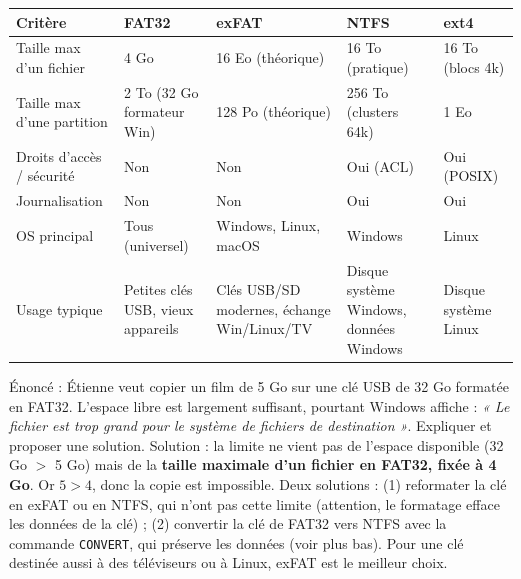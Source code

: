 \documentclass[11pt]{article}
\newcommand{\cle}[1]{{\popxbold\color{popdark}#1}}
\begin{document}
\begin{center}
\begin{tabularx}{\linewidth}{|l|X|X|X|X|}
\hline
\rowcolor{popblueL} \textbf{Critère} & \textbf{FAT32} & \textbf{exFAT} & \textbf{NTFS} & \textbf{ext4} \\
\hline
Taille max d'un fichier & 4 Go & 16 Eo (théorique) & 16 To (pratique) & 16 To (blocs 4k) \\
\hline
Taille max d'une partition & 2 To (32 Go formateur Win) & 128 Po (théorique) & 256 To (clusters 64k) & 1 Eo \\
\hline
Droits d'accès / sécurité & Non & Non & Oui (ACL) & Oui (POSIX) \\
\hline
Journalisation & Non & Non & Oui & Oui \\
\hline
OS principal & Tous (universel) & Windows, Linux, macOS & Windows & Linux \\
\hline
Usage typique & Petites clés USB, vieux appareils & Clés USB/SD modernes, échange Win/Linux/TV & Disque système Windows, données Windows & Disque système Linux \\
\hline
\end{tabularx}
\end{center}

\begin{exoresolu}
Énoncé : Étienne veut copier un film de 5 Go sur une clé USB de 32 Go formatée en FAT32. L'espace libre est largement suffisant, pourtant Windows affiche : \emph{« Le fichier est trop grand pour le système de fichiers de destination »}. Expliquer et proposer une solution.
\tcblower
Solution : la limite ne vient pas de l'espace disponible (32 Go $>$ 5 Go) mais de la \textbf{taille maximale d'un fichier en FAT32, fixée à 4 Go}. Or $5 > 4$, donc la copie est impossible. Deux solutions : (1) reformater la clé en \cle{exFAT} ou en \cle{NTFS}, qui n'ont pas cette limite (attention, le formatage efface les données de la clé) ; (2) convertir la clé de FAT32 vers NTFS avec la commande \texttt{CONVERT}, qui préserve les données (voir plus bas). Pour une clé destinée aussi à des téléviseurs ou à Linux, exFAT est le meilleur choix.
\end{exoresolu}
\end{document}
